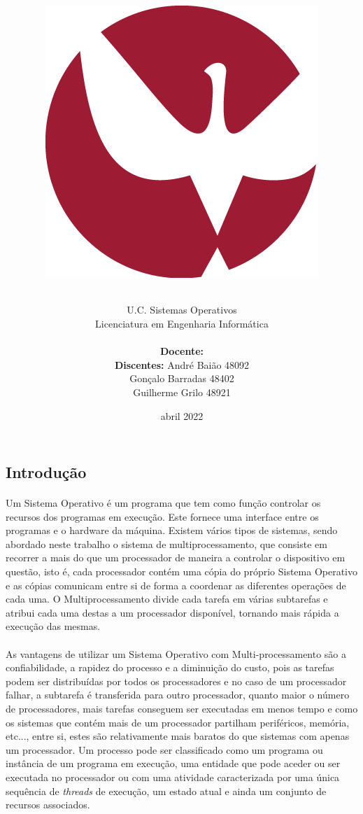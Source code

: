 \documentclass{article}
\title{ \includegraphics[scale=0.3]{imagens/uevora.png}\\
\vspace{1.0cm}
\paragraph{}
U.C. Sistemas Operativos\\
Licenciatura em Engenharia Informática\\
\vspace{0.5cm}
\paragraph{}
\textbf{\work}}
\author{
\vspace{0.5 cm}
\textbf{Docente: }\docente\\
\hspace{1.95 cm} \textbf{Discentes: } André Baião 48092\\
\hspace{5.35 cm} Gonçalo Barradas 48402\\
\hspace{5.1 cm} Guilherme Grilo 48921
}
\date{abril 2022}
\begin{document}
\maketitle
\thispagestyle{empty}
\newpage
\setcounter{page}{1}
\begin{center}
    \section*{Introdução}
\end{center}
\paragraph{}
Um Sistema Operativo é um programa que tem como função controlar os recursos dos programas em execução. Este fornece uma interface entre os programas e o hardware da máquina.
Existem vários tipos de sistemas, sendo abordado neste trabalho o sistema de multiprocessamento, que consiste em recorrer a mais do que um processador de maneira a controlar o dispositivo em questão, isto é, cada processador contém uma cópia do próprio Sistema Operativo e as cópias comunicam entre si de forma a coordenar as diferentes operações de cada uma. O Multiprocessamento divide cada tarefa em várias subtarefas e atribui cada uma destas a um processador disponível, tornando mais rápida a execução das mesmas. 
\vspace{-0.3cm}
\paragraph{}
As vantagens de utilizar um Sistema Operativo com Multi-processamento são a confiabilidade, a rapidez do processo e a diminuição do custo, pois as tarefas podem ser distribuídas por todos os processadores e no caso de um processador falhar, a subtarefa é transferida para outro processador, quanto maior o número de processadores, mais tarefas conseguem ser executadas em menos tempo e como os sistemas que contém mais de um processador partilham periféricos, memória, etc..., entre si, estes são relativamente mais baratos do que sistemas com apenas um processador.
Um processo pode ser classificado como um programa ou instância de um programa em execução, uma entidade que pode aceder ou ser executada no processador ou com uma atividade caracterizada por uma única sequência de \emph{threads} de execução, um estado atual e ainda um conjunto de recursos associados.
\vspace{-0.3cm}
\end{document}
